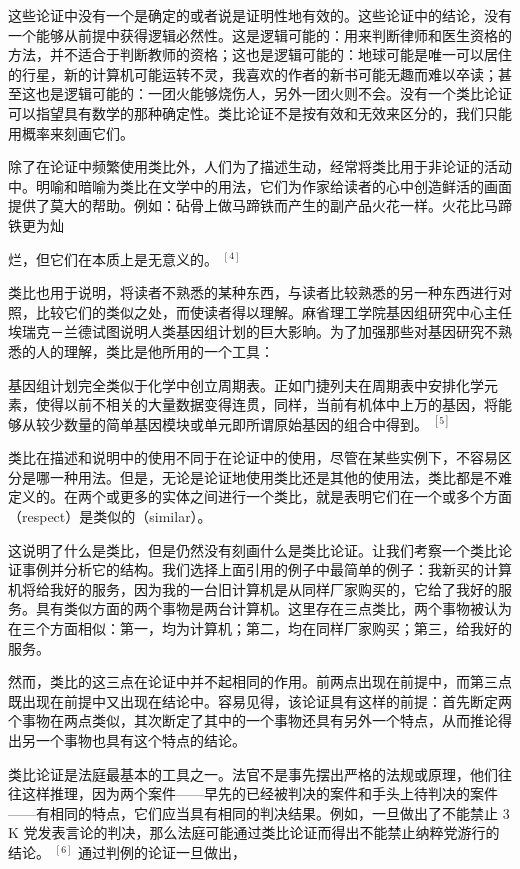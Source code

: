这些论证中没有一个是确定的或者说是证明性地有效的。这些论证中的结论，没有一个能够从前提中获得逻辑必然性。这是逻辑可能的：用来判断律师和医生资格的方法，并不适合于判断教师的资格；这也是逻辑可能的：地球可能是唯一可以居住的行星，新的计算机可能运转不灵，我喜欢的作者的新书可能无趣而难以卒读；甚至这也是逻辑可能的：一团火能够烧伤人，另外一团火则不会。没有一个类比论证可以指望具有数学的那种确定性。类比论证不是按有效和无效来区分的，我们只能用概率来刻画它们。

除了在论证中频繁使用类比外，人们为了描述生动，经常将类比用于非论证的活动中。明喻和暗喻为类比在文学中的用法，它们为作家给读者的心中创造鲜活的画面提供了莫大的帮助。例如：砧骨上做马蹄铁而产生的副产品火花一样。火花比马蹄铁更为灿

烂，但它们在本质上是无意义的。 ${ }^{[4]}$

类比也用于说明，将读者不熟悉的某种东西，与读者比较熟悉的另一种东西进行对照，比较它们的类似之处，而使读者得以理解。麻省理工学院基因组研究中心主任埃瑞克－兰德试图说明人类基因组计划的巨大影晌。为了加强那些对基因研究不熟悉的人的理解，类比是他所用的一个工具：

基因组计划完全类似于化学中创立周期表。正如门捷列夫在周期表中安排化学元素，使得以前不相关的大量数据变得连贯，同样，当前有机体中上万的基因，将能够从较少数量的简单基因模块或单元即所谓原始基因的组合中得到。 ${ }^{[5]}$

类比在描述和说明中的使用不同于在论证中的使用，尽管在某些实例下，不容易区分是哪一种用法。但是，无论是论证地使用类比还是其他的使用法，类比都是不难定义的。在两个或更多的实体之间进行一个类比，就是表明它们在一个或多个方面（respect）是类似的（similar）。

这说明了什么是类比，但是仍然没有刻画什么是类比论证。让我们考察一个类比论证事例并分析它的结构。我们选择上面引用的例子中最简单的例子：我新买的计算机将给我好的服务，因为我的一台旧计算机是从同样厂家购买的，它给了我好的服务。具有类似方面的两个事物是两台计算机。这里存在三点类比，两个事物被认为在三个方面相似：第一，均为计算机；第二，均在同样厂家购买；第三，给我好的服务。

然而，类比的这三点在论证中并不起相同的作用。前两点出现在前提中，而第三点既出现在前提中又出现在结论中。容易见得，该论证具有这样的前提：首先断定两个事物在两点类似，其次断定了其中的一个事物还具有另外一个特点，从而推论得出另一个事物也具有这个特点的结论。

类比论证是法庭最基本的工具之一。法官不是事先摆出严格的法规或原理，他们往往这样推理，因为两个案件——早先的已经被判决的案件和手头上待判决的案件——有相同的特点，它们应当具有相同的判决结果。例如，一旦做出了不能禁止 3 K 党发表言论的判决，那么法庭可能通过类比论证而得出不能禁止纳粹党游行的结论。 ${ }^{[6]}$ 通过判例的论证一旦做出，

